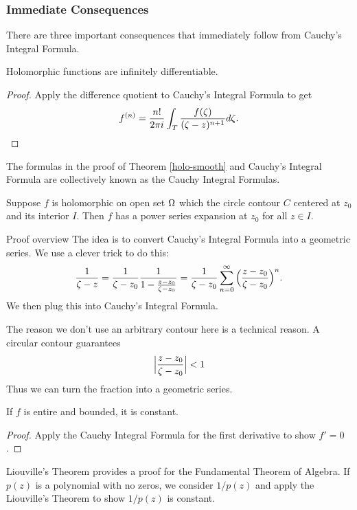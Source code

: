 \subsubsection{Immediate Consequences}
There are three important consequences that immediately follow from Cauchy's Integral Formula.
\begin{thm}
    \label{holo-smooth}
    Holomorphic functions are infinitely differentiable.
\end{thm}
\begin{proof}
    Apply the difference quotient to Cauchy's Integral Formula to get
    \[
        f^{(n)} = \frac{n!}{2\pi i}\int_T \frac{f(\zeta)}{(\zeta-z)^{n+1}}d\zeta.
    \]
\end{proof}
\begin{remark}
    The formulas in the proof of Theorem \ref{holo-smooth} and Cauchy's Integral Formula are collectively known as the Cauchy Integral Formulas.
\end{remark}
\begin{thm}
    Suppose $f$ is holomorphic on open set $\Omega$ which the circle contour $C$ centered at $z_0$ and its interior $I$. Then $f$ has a power series expansion at $z_0$ for all $z \in I$.
\end{thm}
\begin{details}{Proof overview}
    The idea is to convert Cauchy's Integral Formula into a geometric series. We use a clever trick to do this:
    \[
        \frac{1}{\zeta-z} = \frac{1}{\zeta -z_0} \frac{1}{1 - \frac{z-z_0}{\zeta-z_0}} = \frac{1}{\zeta-z_0}\sum_{n=0}^\infty \Big( \frac{z-z_0}{\zeta-z_0} \Big)^n.
    \]
    We then plug this into Cauchy's Integral Formula.
\end{details}
\begin{remark}
    The reason we don't use an arbitrary contour here is a technical reason. A circular contour guarantees
    \[
        \Big| \frac{z - z_0}{\zeta - z_0} \Big| < 1
    \]
    Thus we can turn the fraction into a geometric series.
\end{remark}
\begin{thm}[Liouville]
    If $f$ is entire and bounded, it is constant.
\end{thm}
\begin{proof}
    Apply the Cauchy Integral Formula for the first derivative to show $f' = 0$.
\end{proof}
Liouville's Theorem provides a proof for the Fundamental Theorem of Algebra. If $p(z)$ is a polynomial with no zeros, we consider $1/p(z)$ and apply the Liouville's Theorem to show $1/p(z)$ is constant.

